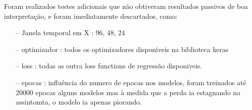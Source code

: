 Foram realizados testes adicionais que não obtiveram resultados passivos de boa interpretação, e foram imediatamente descartados, como:

\begin{itemize}
    \item[--] Janela temporal em X : 96, 48, 24
    \item[--] optimizador : todos os optimizadores disponiveis na biblioteca keras
    \item[--] loss : todas as outra loss functions de regressão disponiveis.
    \item[--] epocas : influência do numero de epocas nos modelos, foram treinados até 20000 epocas alguns modelos mas à medida que a perda ia estagnando na assintomta, o modelo ia apenas piorando.
\end{itemize}

